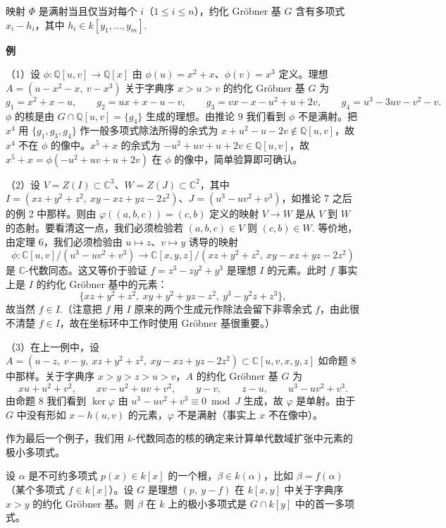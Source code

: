 \begin{corollary}\label{cor:15.9}
映射 \(\Phi\) 是满射当且仅当对每个 \(i\)（\(1 \leq i \leq n\)），约化 Gröbner 基 \(G\) 含有多项式 \(x_i-h_i\)，其中 \(h_i \in k[y_1, \ldots, y_m]\).
\end{corollary}

\noindent\textbf{例}

（1）设 \(\phi : \mathbb{Q}[u,v] \to \mathbb{Q}[x]\) 由 \(\phi(u) = x^2+x\)、\(\phi(v) = x^3\) 定义。理想 \(A = (u-x^2-x,\ v-x^3)\) 关于字典序 \(x > u > v\) 的约化 Gröbner 基 \(G\) 为
\[
g_1 = x^2+x-u, \qquad g_2 = ux+x-u-v, \qquad g_3 = vx-x-u^2+u+2v, \qquad g_4 = u^3-3uv-v^2-v.
\]
\(\phi\) 的核是由 \(G \cap \mathbb{Q}[u,v] = \{g_4\}\) 生成的理想。由推论 9 我们看到 \(\phi\) 不是满射。把 \(x^4\) 用 \(\{g_1, g_3, g_4\}\) 作一般多项式除法所得的余式为 \(x+u^2-u-2v \notin \mathbb{Q}[u,v]\)，故 \(x^4\) 不在 \(\phi\) 的像中。\(x^5+x\) 的余式为 \(-u^2+uv+u+2v \in \mathbb{Q}[u,v]\)，故 \(x^5+x = \phi(-u^2+uv+u+2v)\) 在 \(\phi\) 的像中，简单验算即可确认。

（2）设 \(V = Z(I) \subset \mathbb{C}^3\)、\(W = Z(J) \subset \mathbb{C}^2\)，其中 \(I = (xz+y^2+z^2,\ xy-xz+yz-2z^2)\)、\(J = (u^3-uv^2+v^3)\)，如推论 7 之后的例 2 中那样。则由 \(\varphi((a,b,c)) = (c,b)\) 定义的映射 \(V \to W\) 是从 \(V\) 到 \(W\) 的态射。要看清这一点，我们必须检验若 \((a,b,c) \in V\) 则 \((c,b) \in W\). 等价地，由定理 6，我们必须检验由 \(u \mapsto z\)、\(v \mapsto y\) 诱导的映射
\[
\phi : \mathbb{C}[u,v]/(u^3-uv^2+v^3) \to \mathbb{C}[x,y,z]/(xz+y^2+z^2,\ xy-xz+yz-2z^2)
\]
是 \(\mathbb{C}\)-代数同态。这又等价于验证 \(f = z^3-zy^2+y^3\) 是理想 \(I\) 的元素。此时 \(f\) 事实上是 \(I\) 的约化 Gröbner 基中的元素：
\[
\{xz+y^2+z^2,\ xy+y^2+yz-z^2,\ y^3-y^2z+z^3\},
\]
故当然 \(f \in I\).（注意把 \(f\) 用 \(I\) 原来的两个生成元作除法会留下非零余式 \(f\)，由此很不清楚 \(f \in I\)，故在坐标环中工作时使用 Gröbner 基很重要。）

（3）在上一例中，设 \(A = (u-z,\ v-y,\ xz+y^2+z^2,\ xy-xz+yz-2z^2) \subset \mathbb{C}[u,v,x,y,z]\) 如命题 8 中那样。关于字典序 \(x > y > z > u > v\)，\(A\) 的约化 Gröbner 基 \(G\) 为
\[
xu+u^2+v^2, \qquad xv-u^2+uv+v^2, \qquad y-v, \qquad z-u, \qquad u^3-uv^2+v^3.
\]
由命题 8 我们看到 \(\ker\varphi\) 由 \(u^3-uv^2+v^3 \equiv 0 \bmod J\) 生成，故 \(\varphi\) 是单射。由于 \(G\) 中没有形如 \(x-h(u,v)\) 的元素，\(\varphi\) 不是满射（事实上 \(x\) 不在像中）。

作为最后一个例子，我们用 \(k\)-代数同态的核的确定来计算单代数域扩张中元素的极小多项式。

\begin{proposition}\label{pro:15.10}
设 \(\alpha\) 是不可约多项式 \(p(x) \in k[x]\) 的一个根，\(\beta \in k(\alpha)\)，比如 \(\beta = f(\alpha)\)（某个多项式 \(f \in k[x]\)）。设 \(G\) 是理想 \((p,\ y-f)\) 在 \(k[x,y]\) 中关于字典序 \(x > y\) 的约化 Gröbner 基。则 \(\beta\) 在 \(k\) 上的极小多项式是 \(G \cap k[y]\) 中的首一多项式。
\end{proposition}

